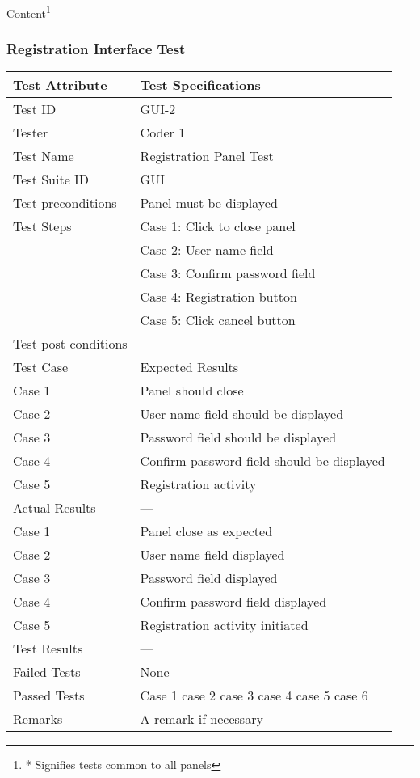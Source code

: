 \documentclass{article}
\begin{document}
Content\footnote{* Signifies tests common to all panels}
\label{table:2m}

\newpage

\subsubsection{Registration Interface Test}


\begin{table}[htbp]
\begin{center}
\begin{tabular}{|l | l|}
\hline
Test Attribute & Test Specifications \\
\hline
Test ID & GUI-2 \\
\hline
Tester  & Coder 1 \\
\hline

Test Name  & Registration Panel Test \\
\hline
Test Suite  ID& GUI \\

\hline
Test preconditions & Panel must be displayed \\
\hline
Test Steps & Case 1: Click to close panel \\
\hline
  & Case 2: User name field  \\
\hline
  & Case 3: Confirm password field  \\
\hline
  & Case 4: Registration button  \\
\hline
& Case 5: Click cancel button  \\
\hline

Test post conditions & --- \\
\hline
Test Case & Expected Results\\
\hline
\hline
Case 1  &  Panel should close  \\
\hline
  Case 2 &  User name field should be displayed  \\
\hline
  Case 3 & Password field should be displayed  \\
\hline
 Case 4 & Confirm password field should be displayed  \\
\hline
Case 5 & Registration activity  \\
\hline

Actual Results & ---\\
\hline
\hline
Case 1  &  Panel close as expected  \\
\hline
  Case 2 &  User name field displayed  \\
\hline
  Case 3 & Password field displayed  \\
\hline
 Case 4 & Confirm password field displayed  \\
\hline
Case 5 & Registration activity initiated  \\
\hline
Test Results & ---\\
\hline
Failed Tests & None\\
\hline
Passed Tests & Case 1 case 2 case 3 case 4 case 5 case 6\\
\hline
Remarks & A remark if necessary \\
\hline


\end{tabular}
\end{center}
\end{table}
\end{document}
